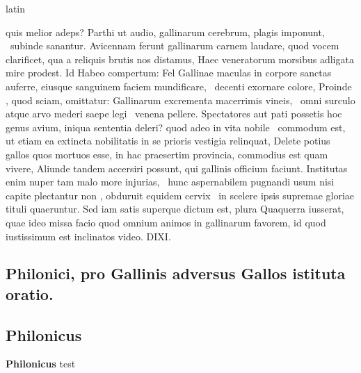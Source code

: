 \documentclass[12pt]{book}
\renewenvironment{latin}
    	{\begin{hyphenrules}{latin}}
    	{\end{hyphenrules}}
\begin{document}
\begin{pages}
\begin{latin}
\begin{Leftside}
                    quis melior adeps? 
                    Parthi ut audio, gallinarum cerebrum, plagis imponunt,  \ampersand\ subinde sanantur. 
                    Avicennam ferunt gallinarum carnem laudare, quod vocem clarificet, 
                    qua a reliquis brutis nos distamus, Haec veneratorum morsibus adligata mire prodest. 
                    Id Habeo compertum: 
                    Fel Gallinae maculas in corpore sanctas auferre, eiusque sanguinem faciem mundificare,  \ampersand\ decenti exornare colore, 
                    Proinde , quod sciam, omittatur: 
                    Gallinarum excrementa macerrimis vineis,  \ampersand\ omni surculo atque arvo mederi saepe legi  \ampersand\ venena pellere. 
                     Spectatores aut pati possetis hoc genus avium, iniqua sententia deleri? 
                    quod adeo in vita nobile  \ampersand\ commodum est, ut etiam ea extincta nobilitatis in se prioris vestigia relinquat, 
                    Delete potius gallos quos mortuos esse, in hac praesertim provincia, commodius est quam vivere, 
                    Aliunde tandem accersiri possunt, qui gallinis officium faciunt. 
                    Institutas enim nuper tam   malo more injurias,  \ampersand\ hunc aspernabilem pugnandi usum nisi capite plectantur non , 
                    obduruit equidem cervix  \ampersand\ in scelere ipsis supremae gloriae tituli quaeruntur. 
                    Sed iam satis superque dictum est,  plura Quaquerra iusserat, quae ideo missa facio quod omnium animos in gallinarum favorem, 
                    id quod iustissimum est inclinatos video. DIXI.
                \pend 
        \endnumbering
        \end{Leftside}
        \end{latin}

        \begin{Rightside}
        \beginnumbering
            \pstart\section*{Philonici, pro Gallinis adversus Gallos istituta oratio.}\pend\pstart\subsection*{Philonicus}\pend\pstart\textbf{Philonicus}\hspace{1cm} 
                        test
                    \pend
        \endnumbering
        \end{Rightside}
        \end{pages}
        \Pages
        
\end{document}
